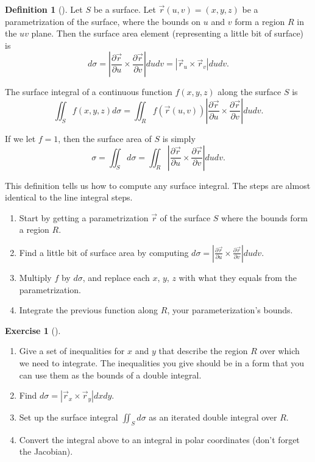 \documentclass[10pt,]{book}
\theoremstyle{plain}
\theoremstyle{definition}
\newtheorem{definition}[theorem]{Definition}
\theoremstyle{definition}
\theoremstyle{definition}
\theoremstyle{definition}
\newtheorem{exploration}[project]{Exercise}
\theoremstyle{definition}
\numberwithin{equation}{section}
\begin{document}
\begin{definition}[{}]\label{definition-45}
Let \(S\) be a surface. Let \(\vec r(u,v)=(x,y,z)\) be a parametrization of the surface, where the bounds on \(u\) and \(v\) form a region \(R\) in the \(uv\) plane. Then the surface area element (representing a little bit of surface) is%
\begin{equation*}
d\sigma =\left |\frac{\partial \vec r}{\partial u} \times \frac{\partial \vec r}{\partial v}\right| dudv = \left|\vec r_u\times\vec r_v\right|dudv.
\end{equation*}
%
\par
The surface integral of a continuous function \(f(x,y,z)\) along the surface \(S\) is%
\begin{equation*}
\iint_S f(x,y,z) d\sigma = \iint_R f(\vec r(u,v)) \left |\frac{\partial \vec r}{\partial u} \times \frac{\partial \vec r}{\partial v}\right| dudv.
\end{equation*}
%
\par
If we let \(f=1\), then the surface area of \(S\) is simply%
\begin{equation*}
\sigma = \iint_S d\sigma = \iint_R \left |\frac{\partial \vec r}{\partial u} \times \frac{\partial \vec r}{\partial v}\right| dudv.
\end{equation*}
%
\end{definition}
This definition tells us how to compute any surface integral. The steps are almost identical to the line integral steps. \leavevmode%
\begin{enumerate}
\item\hypertarget{li-203}{}Start by getting a parametrization \(\vec r\) of the surface \(S\) where the bounds form a region \(R\).%
\item\hypertarget{li-204}{}Find a little bit of surface area by computing \(d\sigma =\left |\frac{\partial \vec r}{\partial u} \times \frac{\partial \vec r}{\partial v}\right| dudv.\)%
\item\hypertarget{li-205}{}Multiply \(f\) by \(d\sigma\), and replace each \(x\), \(y\), \(z\) with what they equals from the parametrization.%
\item\hypertarget{li-206}{}Integrate the previous function along \(R\), your parameterization's bounds.%
\end{enumerate}
%
\begin{exploration}[]\label{exploration-277}
\leavevmode%
\begin{enumerate}[font=\bfseries,label=(\alph*),ref=\alph*]
\item\label{task-749} Give a set of inequalities for \(x\) and \(y\) that describe the region \(R\) over which we need to integrate. The inequalities you give should be in a form that you can use them as the bounds of a double integral.%
\item\label{task-750} Find \(d\sigma = \left|\vec r_x\times \vec r_y\right|dxdy\).%
\item\label{task-751} Set up the surface integral \(\iint_S d\sigma\) as an iterated double integral over \(R\).%
\item\label{task-752} Convert the integral above to an integral in polar coordinates (don't forget the Jacobian).%
\end{enumerate}
\end{exploration}
\end{document}
